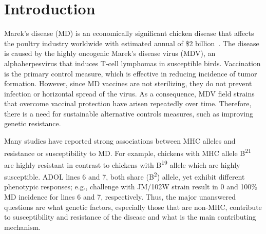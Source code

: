 \documentclass[10pt]{article}
\begin{document}
\section*{Introduction}

Marek's disease (MD) is an economically significant chicken
disease that affects the poultry industry worldwide with
estimated annual of \$2 billion~\cite{morrow2004marek}.  The
disease is caused by the highly oncogenic Marek's disease virus
(MDV), an alphaherpesvirus that induces T-cell lymphomas in
susceptible birds.  Vaccination is the primary control measure,
which is effective in reducing incidence of tumor formation.
However, since MD vaccines are not sterilizing, they do not
prevent infection or horizontal spread of the virus.  As a
consequence, MDV field strains that overcome vaccinal protection
have arisen repeatedly over time.  Therefore, there is a need for
sustainable alternative controls measures, such as improving
genetic resistance.

Many studies have reported strong associations between MHC
alleles and resistance or susceptibility to MD.  For example,
chickens with MHC allele B\textsuperscript{21} are highly
resistant in contrast to chickens with B\textsuperscript{19}
allele which are highly susceptible.  ADOL lines 6 and 7, both
share (B\textsuperscript{2}) allele, yet exhibit different
phenotypic responses; e.g., challenge with JM/102W strain result
in 0 and 100\% MD incidence for lines 6 and 7, respectively.
Thus, the major unanswered questions are what genetic factors,
especially those that are non-MHC, contribute to susceptibility
and resistance of the disease and what is the main contributing
mechanism.
\end{document}
